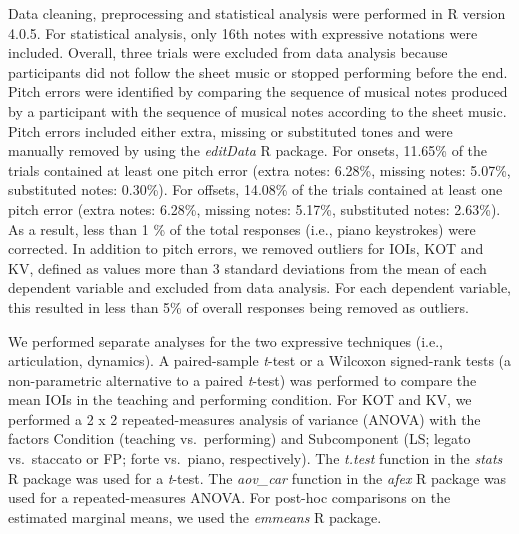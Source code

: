 \documentclass[
  english,
  man,floatsintext]{apa6}
\begin{document}
Data cleaning, preprocessing and statistical analysis were performed in R version 4.0.5. For statistical analysis, only 16th notes with expressive notations were included. Overall, three trials were excluded from data analysis because participants did not follow the sheet music or stopped performing before the end. Pitch errors were identified by comparing the sequence of musical notes produced by a participant with the sequence of musical notes according to the sheet music. Pitch errors included either extra, missing or substituted tones and were manually removed by using the \emph{editData} R package. For onsets, 11.65\% of the trials contained at least one pitch error (extra notes: 6.28\%, missing notes: 5.07\%, substituted notes: 0.30\%). For offsets, 14.08\% of the trials contained at least one pitch error (extra notes: 6.28\%, missing notes: 5.17\%, substituted notes: 2.63\%). As a result, less than 1 \% of the total responses (i.e., piano keystrokes) were corrected. In addition to pitch errors, we removed outliers for IOIs, KOT and KV, defined as values more than 3 standard deviations from the mean of each dependent variable and excluded from data analysis. For each dependent variable, this resulted in less than 5\% of overall responses being removed as outliers.

We performed separate analyses for the two expressive techniques (i.e., articulation, dynamics). A paired-sample \emph{t}-test or a Wilcoxon signed-rank tests (a non-parametric alternative to a paired \emph{t}-test) was performed to compare the mean IOIs in the teaching and performing condition. For KOT and KV, we performed a 2 x 2 repeated-measures analysis of variance (ANOVA) with the factors Condition (teaching vs.~performing) and Subcomponent (LS; legato vs.~staccato or FP; forte vs.~piano, respectively). The \emph{t.test} function in the \emph{stats} R package was used for a \emph{t}-test. The \emph{aov\_car} function in the \emph{afex} R package was used for a repeated-measures ANOVA. For post-hoc comparisons on the estimated marginal means, we used the \emph{emmeans} R package.
\end{document}
